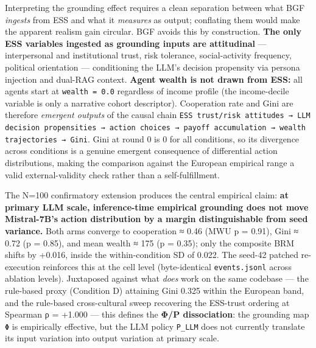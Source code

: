 

Interpreting the grounding effect requires a clean separation between what BGF \textit{ingests} from ESS and what it \textit{measures} as output; conflating them would make the apparent realism gain circular. BGF avoids this by construction. \textbf{The only ESS variables ingested as grounding inputs are attitudinal} — interpersonal and institutional trust, risk tolerance, social-activity frequency, political orientation — conditioning the LLM's decision propensity via persona injection and dual-RAG context. \textbf{Agent wealth is not drawn from ESS:} all agents start at \texttt{wealth = 0.0} regardless of income profile (the income-decile variable is only a narrative cohort descriptor). Cooperation rate and Gini are therefore \textit{emergent outputs} of the causal chain \texttt{ESS trust/risk attitudes → LLM decision propensities → action choices → payoff accumulation → wealth trajectories → Gini}. Gini at round 0 is 0 for all conditions, so its divergence across conditions is a genuine emergent consequence of differential action distributions, making the comparison against the European empirical range a valid external-validity check rather than a self-fulfillment.


The N=100 confirmatory extension produces the central empirical claim: \textbf{at primary LLM scale, inference-time empirical grounding does not move Mistral-7B's action distribution by a margin distinguishable from seed variance.} Both arms converge to cooperation ≈ 0.46 (MWU p = 0.91), Gini ≈ 0.72 (p = 0.85), and mean wealth ≈ 175 (p = 0.35); only the composite BRM shifts by +0.016, inside the within-condition SD of 0.022. The seed-42 patched re-execution reinforces this at the cell level (byte-identical \texttt{events.jsonl} across ablation levels). Juxtaposed against what \textit{does} work on the same codebase — the rule-based proxy (Condition D) attaining Gini 0.325 within the European band, and the rule-based cross-cultural sweep recovering the ESS-trust ordering at Spearman ρ = +1.000 — this defines the \textbf{Φ/P dissociation}: the grounding map \texttt{Φ} is empirically effective, but the LLM policy \texttt{P\_LLM} does not currently translate its input variation into output variation at primary scale.

